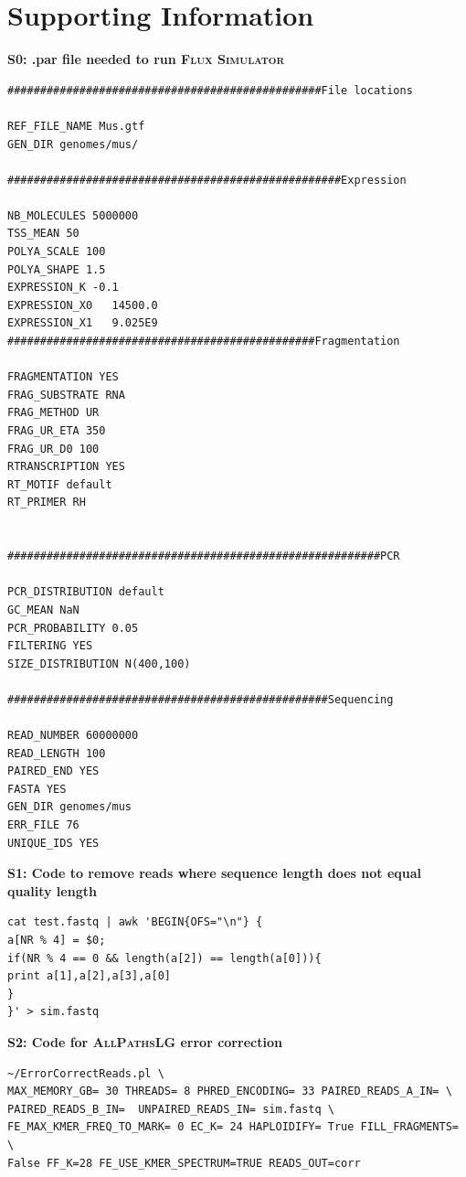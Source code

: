 \documentclass[11pt]{article}
\begin{document}
\singlespacing





\section*{Supporting Information}
\vspace{8mm}
\noindent
\textbf{\large{S0: .par file needed to run \textsc{Flux Simulator}}}
\normalsize
\begin{lstlisting}
################################################File locations

REF_FILE_NAME Mus.gtf
GEN_DIR genomes/mus/

###################################################Expression

NB_MOLECULES 5000000
TSS_MEAN 50
POLYA_SCALE 100
POLYA_SHAPE 1.5
EXPRESSION_K -0.1
EXPRESSION_X0	14500.0
EXPRESSION_X1	9.025E9
###############################################Fragmentation

FRAGMENTATION YES
FRAG_SUBSTRATE RNA
FRAG_METHOD UR
FRAG_UR_ETA 350
FRAG_UR_D0 100
RTRANSCRIPTION YES
RT_MOTIF default
RT_PRIMER RH


#########################################################PCR

PCR_DISTRIBUTION default
GC_MEAN NaN
PCR_PROBABILITY 0.05
FILTERING YES
SIZE_DISTRIBUTION N(400,100)

#################################################Sequencing

READ_NUMBER 60000000
READ_LENGTH 100
PAIRED_END YES 
FASTA YES
GEN_DIR genomes/mus
ERR_FILE 76
UNIQUE_IDS YES
\end{lstlisting}


\vspace{8mm}
\noindent
\textbf{\large{S1: Code to remove reads where sequence length does not equal quality length}}
\normalsize

\begin{lstlisting}
cat test.fastq | awk 'BEGIN{OFS="\n"} { 
a[NR % 4] = $0; 
if(NR % 4 == 0 && length(a[2]) == length(a[0])){
print a[1],a[2],a[3],a[0] 
}
}' > sim.fastq
\end{lstlisting}


\vspace{8mm}
\noindent
\textbf{\large{S2: Code for \textsc{AllPathsLG} error correction}}
\normalsize

\lstset{language=Bash} 
\begin{lstlisting}
~/ErrorCorrectReads.pl \
MAX_MEMORY_GB= 30 THREADS= 8 PHRED_ENCODING= 33 PAIRED_READS_A_IN= \
PAIRED_READS_B_IN=  UNPAIRED_READS_IN= sim.fastq \
FE_MAX_KMER_FREQ_TO_MARK= 0 EC_K= 24 HAPLOIDIFY= True FILL_FRAGMENTS= \
False FF_K=28 FE_USE_KMER_SPECTRUM=TRUE READS_OUT=corr
\end{lstlisting}
\end{document}
